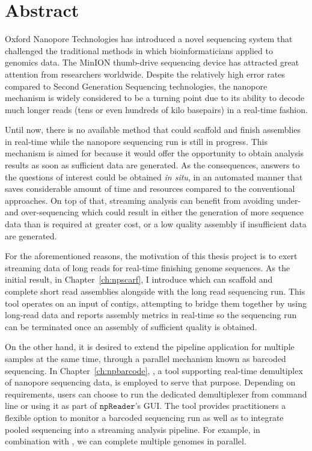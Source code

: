 \chapter*{Abstract}

Oxford Nanopore Technologies has introduced a novel sequencing system that challenged the traditional methods in which bioinformaticians applied to genomics data. The MinION thumb-drive sequencing device has attracted great attention from researchers worldwide. Despite the relatively high error rates compared to Second Generation Sequencing technologies, the nanopore mechanism is widely considered to be a turning point due to its ability to decode much longer reads (tens or even hundreds of kilo basepairs) in a real-time fashion.

Until now, there is no available method that could scaffold and finish assemblies in real-time while the nanopore sequencing run is still in progress. This mechanism is aimed for because it would offer the opportunity to obtain analysis results as soon as sufficient data are generated.
As the consequences, answers to the questions of interest could be obtained \emph{in situ}, in an automated manner that saves considerable amount of time and resources compared to the conventional approaches.
On top of that, streaming analysis can benefit from avoiding under- and over-sequencing which could result in either the generation of more sequence data than is required at greater cost, or a low quality assembly if insufficient data are generated.

For the aforementioned reasons, the motivation of this thesis project is to exert streaming data of long reads for real-time finishing genome sequences.
As the initial result, in Chapter~\ref{ch:npscarf}, I introduce \npscarf{} which can scaffold and complete short read assemblies alongside with the long read sequencing run. This tool operates on an input of contigs, attempting to bridge them together by using long-read data and reports assembly metrics in real-time so the sequencing run can be terminated once an assembly of sufficient quality is obtained.

On the other hand, it is desired to extend the pipeline application for multiple samples at the same time, through a parallel mechanism known as barcoded sequencing.
In Chapter~\ref{ch:npbarcode}, \npbarcode{}, a tool supporting real-time demultiplex of nanopore sequencing data, is employed to serve that purpose. 
Depending on requirements, users can choose to run the dedicated demultiplexer from command line or using it as part of $\mathtt{npReader}$'s GUI. The tool provides practitioners a flexible option to monitor a barcoded sequencing run as well as to integrate pooled sequencing into a streaming analysis pipeline. For example, in combination with \npscarf{}, we can complete multiple genomes in parallel.

